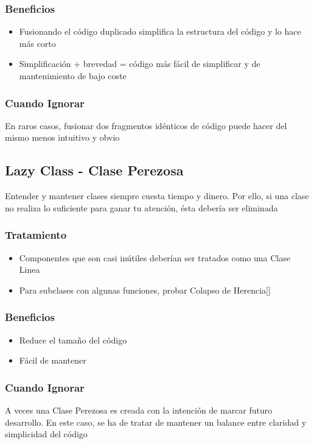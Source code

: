 \documentclass[11pt,a4paper,oneside]{book}
\begin{document}
\subsubsection{Beneficios}
\begin{itemize}
    \item Fusionando el código duplicado simplifica la estructura del código y lo hace más corto
    \item Simplificación + brevedad =  código más fácil de simplificar y de mantenimiento de bajo coste
\end{itemize}
\subsubsection{Cuando Ignorar}
En raros casos, fusionar dos fragmentos idénticos de código puede hacer del mismo menos intuitivo y obvio

\subsection{Lazy Class - Clase Perezosa}
\label{lazyclass}
Entender y mantener clases siempre cuesta tiempo y dinero. Por ello, si una clase no realiza lo suficiente para ganar tu atención, ésta debería ser eliminada
\subsubsection{Tratamiento}
\begin{itemize}
    \item Componentes que son casi inútiles deberían ser tratados como una Clase Linea
    \item Para subclases con algunas funciones, probar Colapso de Herencia[\pageref{colapsehierarchy}]
\end{itemize}
\subsubsection{Beneficios}
\begin{itemize}
    \item Reduce el tamaño del código
    \item Fácil de mantener
\end{itemize}
\subsubsection{Cuando Ignorar}
A veces una Clase Perezosa es creada con la intención de marcar futuro desarrollo. En este caso, se ha de tratar de mantener un balance entre claridad y simplicidad del código  
\end{document}
